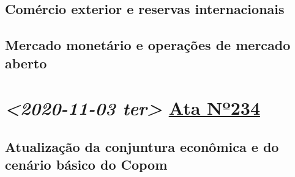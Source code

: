 \documentclass[11pt]{article}
\begin{document}
\subsection*{Comércio exterior e reservas internacionais}
\label{sec:orgcf65165}
\subsection*{Mercado monetário e operações de mercado aberto}
\label{sec:orgfac70bd}
\section*{\textit{<2020-11-03 ter> } \href{https://www.bcb.gov.br/publicacoes/atascopom/28102020}{Ata Nº234}}
\label{sec:orga5fc477}
\subsection*{Atualização da conjuntura econômica e do cenário básico do Copom}
\label{sec:org7f02a97}
\end{document}
